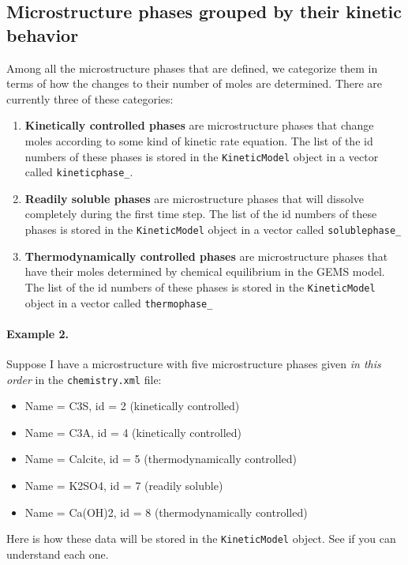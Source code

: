 \documentclass{article}
\begin{document}
\subsection{Microstructure phases grouped by their kinetic behavior}
Among all the microstructure phases that are defined, we categorize
them in terms of how the changes to their number of moles are determined.
There are currently three of these categories:
\begin{enumerate}
    \item \textbf{Kinetically controlled phases} are microstructure
        phases that change moles according to some kind of kinetic
        rate equation.  The list of the id numbers of these phases is stored
        in the \verb!KineticModel! object in a vector called \verb!kineticphase_!.
    \item \textbf{Readily soluble phases} are microstructure phases that
        will dissolve completely during the first time step.  The list of
        the id numbers of these phases is stored in the \verb!KineticModel!
        object in a vector called \verb!solublephase_!
    \item \textbf{Thermodynamically controlled phases} are microstructure phases
        that have their moles determined by chemical equilibrium in the GEMS
        model. The list of
        the id numbers of these phases is stored in the \verb!KineticModel!
        object in a vector called \verb!thermophase_!
\end{enumerate}

\paragraph{Example 2.}  Suppose I have a microstructure with five microstructure
phases given \textit{in this order} in the \verb!chemistry.xml! file:
\begin{itemize}
    \item Name = C3S, id = 2 (kinetically controlled)
    \item Name = C3A, id = 4 (kinetically controlled)
    \item Name = Calcite, id = 5 (thermodynamically controlled)
    \item Name = K2SO4, id = 7 (readily soluble)
    \item Name = Ca(OH)2, id = 8 (thermodynamically controlled)
\end{itemize}
Here is how these data will be stored in the \verb!KineticModel! object.
See if you can understand each one.
\end{document}
